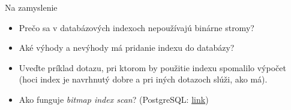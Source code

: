 \documentclass[12pt]{beamer}
\begin{document}
\begin{frame}{Na zamyslenie}
\begin{itemize}
\item Prečo sa v databázových indexoch nepoužívajú binárne stromy?
\item Aké výhody a nevýhody má pridanie indexu do databázy?
\item Uveďte príklad dotazu, pri ktorom by použitie indexu spomalilo výpočet (hoci index je navrhnutý dobre a pri iných dotazoch slúži, ako má).
\item Ako funguje \emph{bitmap index scan}? (PostgreSQL: \href{https://www.postgresql.org/docs/current/indexes-bitmap-scans.html}{link})
\end{itemize}
\end{frame}
\end{document}
